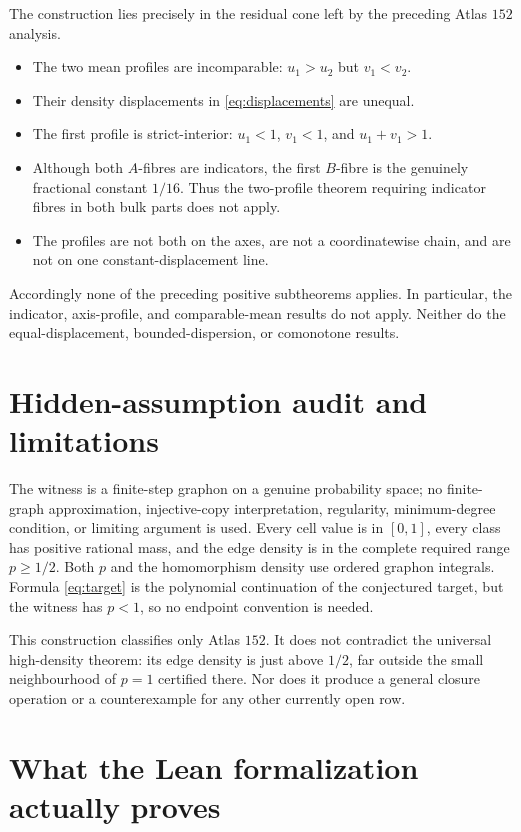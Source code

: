 \documentclass[11pt]{article}
\begin{document}
The construction lies precisely in the residual cone left by the preceding
Atlas $152$ analysis.
\begin{itemize}
 \item The two mean profiles are incomparable: $u_1>u_2$ but $v_1<v_2$.
 \item Their density displacements in \eqref{eq:displacements} are unequal.
 \item The first profile is strict-interior: $u_1<1$, $v_1<1$, and
       $u_1+v_1>1$.
 \item Although both $A$-fibres are indicators, the first $B$-fibre is the
       genuinely fractional constant $1/16$.  Thus the two-profile theorem
       requiring indicator fibres in both bulk parts does not apply.
 \item The profiles are not both on the axes, are not a coordinatewise
       chain, and are not on one constant-displacement line.
\end{itemize}
Accordingly none of the preceding positive subtheorems applies.  In
particular, the indicator, axis-profile, and comparable-mean results do not
apply.  Neither do the equal-displacement, bounded-dispersion, or comonotone
results.

\section{Hidden-assumption audit and limitations}

The witness is a finite-step graphon on a genuine probability space; no
finite-graph approximation, injective-copy interpretation, regularity,
minimum-degree condition, or limiting argument is used.  Every cell value
is in $[0,1]$, every class has positive rational mass, and the edge density
is in the complete required range $p\geq1/2$.  Both $p$ and the
homomorphism density use ordered graphon integrals.  Formula
\eqref{eq:target} is the polynomial continuation of the conjectured target,
but the witness has $p<1$, so no endpoint convention is needed.

This construction classifies only Atlas $152$.  It does not contradict the
universal high-density theorem: its edge density is just above $1/2$, far
outside the small neighbourhood of $p=1$ certified there.  Nor does it
produce a general closure operation or a counterexample for any other
currently open row.

\appendix
\section{What the Lean formalization actually proves}
\end{document}
